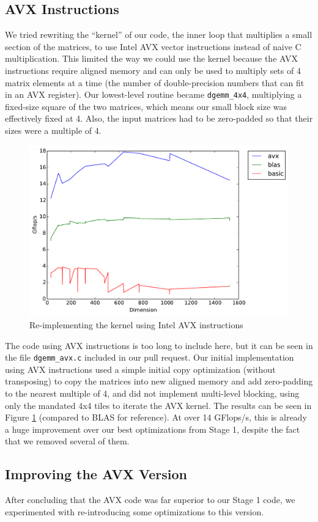 \documentclass[letterpaper]{article}	 %
\begin{document}
\subsection{AVX Instructions}
We tried rewriting the ``kernel'' of our code, the inner loop that multiplies a small section of the matrices, to use Intel AVX vector instructions instead of naive C multiplication. This limited the way we could use the kernel because the AVX instructions require aligned memory and can only be used to multiply sets of 4 matrix elements at a time (the number of double-precision numbers that can fit in an AVX register). Our lowest-level routine became \texttt{dgemm\_4x4}, multiplying a fixed-size square of the two matrices, which means our small block size was effectively fixed at 4. Also, the input matrices had to be zero-padded so that their sizes were a multiple of 4.

\begin{figure}[H]
	\centering
	\includegraphics[width=.6\linewidth]{timing-avx_initial.pdf}
	\caption{Re-implementing the kernel using Intel AVX instructions}
	\label{fig:avx-initial}
\end{figure}

The code using AVX instructions is too long to include here, but it can be seen in the file \texttt{dgemm\_avx.c} included in our pull request. Our initial implementation using AVX instructions used a simple initial copy optimization (without transposing) to copy the matrices into new aligned memory and add zero-padding to the nearest multiple of 4, and did not implement multi-level blocking, using only the mandated 4x4 tiles to iterate the AVX kernel. The results can be seen in Figure \ref{fig:avx-initial} (compared to BLAS for reference). At over 14 GFlops/s, this is already a huge improvement over our best optimizations from Stage 1, despite the fact that we removed several of them.

\subsection{Improving the AVX Version}
After concluding that the AVX code was far superior to our Stage 1 code, we experimented with re-introducing some optimizations to this version.
\end{document}
